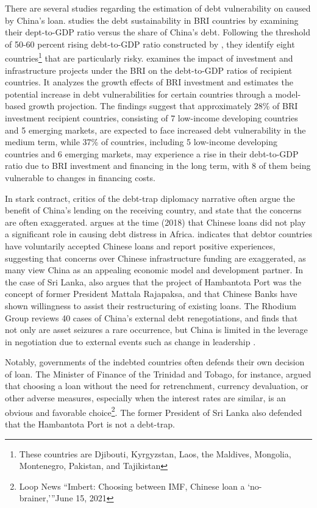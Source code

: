 There are several studies regarding the estimation of debt vulnerability on caused by China's loan. \citet*{Hurley19-8-debt-trap} studies the debt sustainability in BRI countries by examining their dept-to-GDP ratio versus the share of China's debt. Following the threshold of 50-60 percent rising debt-to-GDP ratio constructed by \citet{Chudik-15}, they identify eight
countries\footnote{
    These countries are Djibouti, Kyrgyzstan, Laos, the Maldives, Mongolia, Montenegro, Pakistan, and Tajikistan}
that are particularly risky.
\citet*{Bandiera-Vasileios-BRI-debt} examines the impact of investment and infrastructure projects under the BRI on the debt-to-GDP ratios of recipient countries. It analyzes the growth effects of BRI investment and estimates the potential increase in debt vulnerabilities for certain countries through a model-based growth projection. The findings suggest that approximately 28\% of BRI investment recipient countries, consisting of 7 low-income developing countries and 5 emerging markets, are expected to face increased debt vulnerability in the medium term, while 37\% of countries, including 5 low-income developing countries and 6 emerging markets, may experience a rise in their debt-to-GDP ratio due to BRI investment and financing in the long term, with 8 of them being vulnerable to changes in financing costs.


In stark contract, critics of the debt-trap diplomacy narrative often argue the benefit of China's lending on the receiving country, and state that the concerns are often exaggerated.
\citet*{Eom-18} argues at the time (2018) that Chinese loans did not play a significant role in causing debt distress in Africa.
\citet*{Brautigam-meme-2020} indicates that debtor countries have voluntarily accepted Chinese loans and report positive experiences, suggesting that concerns over Chinese infrastructure funding are exaggerated, as many view China as an appealing economic model and development partner.
In the case of Sri Lanka, \citet*{Brautigam-meme-2020} also argues that the project of Hambantota Port was the concept of former President Mattala Rajapaksa, and that Chinese Banks have shown willingness to assist their restructuring of existing loans.
The Rhodium Group reviews 40 cases of China's external debt renegotiations, and finds that not only are asset seizures a rare occurrence, but China is limited in the leverage in negotiation due to external events such as change in leadership \citep*{Rhodium-DTD-19}.

Notably, governments of the indebted countries often defends their own decision of loan. The Minister of Finance of the Trinidad and Tobago, for instance, argued that choosing a loan without the need for retrenchment, currency devaluation, or other adverse measures, especially when the interest rates are similar, is an obvious and favorable choice\footnote{Loop News ``Imbert: Choosing between IMF, Chinese loan a `no-brainer,'''June 15, 2021}. The former President of Sri Lanka also defended that the Hambantota Port is not a debt-trap.

